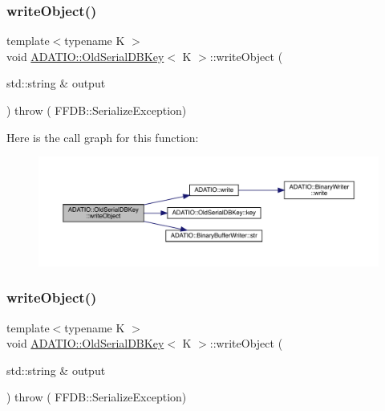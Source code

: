 \mbox{\label{classADATIO_1_1OldSerialDBKey_a4cc6346697a7bda74b9e14672cf21912}} 
\subsubsection{\texorpdfstring{writeObject()}{writeObject()}\hspace{0.1cm}{\footnotesize\ttfamily [1/3]}}
{\footnotesize\ttfamily template$<$typename K $>$ \\
void \mbox{\hyperlink{classADATIO_1_1OldSerialDBKey}{A\+D\+A\+T\+I\+O\+::\+Old\+Serial\+D\+B\+Key}}$<$ K $>$\+::write\+Object (\begin{DoxyParamCaption}\item[{std\+::string \&}]{output }\end{DoxyParamCaption}) throw ( F\+F\+D\+B\+::\+Serialize\+Exception) \hspace{0.3cm}{\ttfamily [inline]}}

Here is the call graph for this function\+:
\nopagebreak
\begin{figure}[H]
\begin{center}
\leavevmode
\includegraphics[width=350pt]{dc/d7d/classADATIO_1_1OldSerialDBKey_a4cc6346697a7bda74b9e14672cf21912_cgraph}
\end{center}
\end{figure}
\mbox{\label{classADATIO_1_1OldSerialDBKey_a4cc6346697a7bda74b9e14672cf21912}} 
\subsubsection{\texorpdfstring{writeObject()}{writeObject()}\hspace{0.1cm}{\footnotesize\ttfamily [2/3]}}
{\footnotesize\ttfamily template$<$typename K $>$ \\
void \mbox{\hyperlink{classADATIO_1_1OldSerialDBKey}{A\+D\+A\+T\+I\+O\+::\+Old\+Serial\+D\+B\+Key}}$<$ K $>$\+::write\+Object (\begin{DoxyParamCaption}\item[{std\+::string \&}]{output }\end{DoxyParamCaption}) throw ( F\+F\+D\+B\+::\+Serialize\+Exception) \hspace{0.3cm}{\ttfamily [inline]}}


